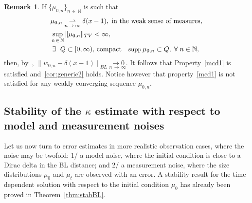 \documentclass[10pt]{amsart}
\theoremstyle{definition}\newtheorem{defi}[theo]{Definition}\newtheorem{rema}[theo]{Remark}\newtheorem{exam}[theo]{Example}\newtheorem{exem}[theo]{Example}\newtheorem{nota}[theo]{Notation}
\newcommand*\N{\mathbb{N}}
\newcommand*\supp{{\mbox{\small\rm supp}}\,}
\let\oldexists\exists
\renewcommand*{\exists}{\mathrel{\oldexists}}
\let\oldforall\forall
\renewcommand*{\forall}{\mathrel{\oldforall}}
\begin{document}
\begin{rema}
If $\{\mu _{0, n}\}_{n\,\in\,\N}$ is such that
\begin{equation*}
\begin{aligned}
& \mu _{0, n} \underset{n\,\to\,\infty}{ \rightharpoonup}\delta (x-1),\; \text{in the weak sense of measures},\\
&\sup_{n\,\in\,\N}\|\mu _{0, n}\|_{TV}<\infty,\\
&\exists\,\,Q\subset [0, \infty),\,\text{compact}\quad\supp \mu _{0, n}\subset Q,\; \forall n\in \N,
\end{aligned}
\end{equation*}
then, by~\cite[Proposition~4]{Hanin}, $\|w_{0, n}-\delta (x-1)\|_{BL}\underset{n\,\to\,\infty}{ \longrightarrow 0}$. It follows that Property~\eqref{mcd1} is satisfied and~\eqref{cor:generic2} holds. Notice however that property~\eqref{mcd1} is not satisfied for any weakly-converging sequence $\mu_{0,n}$.
\end{rema}



\subsection{Stability of the \texorpdfstring{$\kappa$}{kappa} estimate with respect to model and measurement noises}

Let us now turn to error estimates in more realistic observation cases, where the noise may be twofold:
1/ a model noise, where the initial condition is close to a Dirac delta in the BL distance;
and 2/ a measurement noise, where the size distributions $\mu_0$ and $\mu_t$ are observed with an error. A stability result for the time-dependent solution with respect to the initial condition $\mu _0$ has already been proved in Theorem~\ref{thm:stabBL}.
\end{document}
